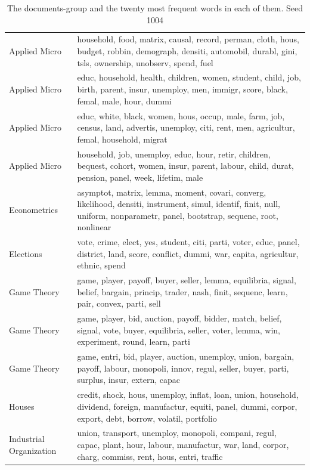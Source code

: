 \begin{table}[tb]
\caption[Groups]{The documents-group and the twenty most frequent words in each of them. Seed 1004}
\label{tab:groups}
\begin{tabularx}{\hsize}{lY}
\toprule
\midrule
Applied Micro & household, food, matrix, causal, record, perman, cloth, hous, budget, robbin, demograph, densiti, automobil, durabl, gini, tsls, ownership, unobserv, spend, fuel \\
Applied Micro & educ, household, health, children, women, student, child, job, birth, parent, insur, unemploy, men, immigr, score, black, femal, male, hour, dummi \\
Applied Micro & educ, white, black, women, hous, occup, male, farm, job, census, land, advertis, unemploy, citi, rent, men, agricultur, femal, household, migrat \\
Applied Micro & household, job, unemploy, educ, hour, retir, children, bequest, cohort, women, insur, parent, labour, child, durat, pension, panel, week, lifetim, male \\
Econometrics & asymptot, matrix, lemma, moment, covari, converg, likelihood, densiti, instrument, simul, identif, finit, null, uniform, nonparametr, panel, bootstrap, sequenc, root, nonlinear \\
Elections & vote, crime, elect, yes, student, citi, parti, voter, educ, panel, district, land, score, conflict, dummi, war, capita, agricultur, ethnic, spend \\
Game Theory & game, player, payoff, buyer, seller, lemma, equilibria, signal, belief, bargain, princip, trader, nash, finit, sequenc, learn, pair, convex, parti, sell \\
Game Theory & game, player, bid, auction, payoff, bidder, match, belief, signal, vote, buyer, equilibria, seller, voter, lemma, win, experiment, round, learn, parti \\
Game Theory & game, entri, bid, player, auction, unemploy, union, bargain, payoff, labour, monopoli, innov, regul, seller, buyer, parti, surplus, insur, extern, capac \\
Houses & credit, shock, hous, unemploy, inflat, loan, union, household, dividend, foreign, manufactur, equiti, panel, dummi, corpor, export, debt, borrow, volatil, portfolio \\
Industrial Organization & union, transport, unemploy, monopoli, compani, regul, capac, plant, hour, labour, manufactur, war, land, corpor, charg, commiss, rent, hous, entri, traffic \\

\end{tabularx}
\end{table}
